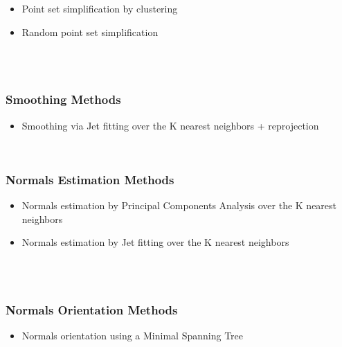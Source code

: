 \begin{itemize}
\item Point set simplification by clustering
\item Random point set simplification
\end{itemize}

  \\
  \\


\subsubsection{Smoothing Methods}

\begin{itemize}
\item Smoothing via Jet fitting over the K nearest neighbors + reprojection
\end{itemize}

  \\


\subsubsection{Normals Estimation Methods}

\begin{itemize}
\item Normals estimation by Principal Components Analysis over the K nearest neighbors
\item Normals estimation by Jet fitting over the K nearest neighbors
\end{itemize}

  \\
  \\


\subsubsection{Normals Orientation Methods}

\begin{itemize}
\item Normals orientation using a Minimal Spanning Tree \cite{cgal:hddms-srup-92}
\end{itemize}

  \\


